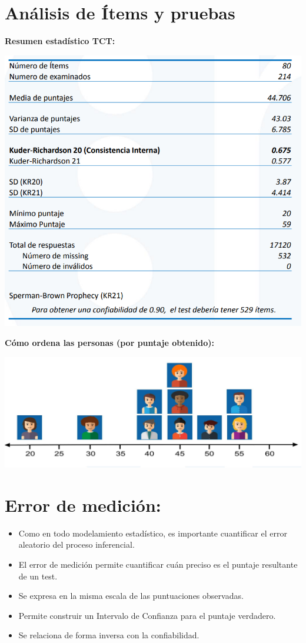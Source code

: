 \documentclass[
  letterpaper,
  DIV=11,
  numbers=noendperiod]{scrreprt}
\providecommand{\tightlist}{%
  \setlength{\itemsep}{0pt}\setlength{\parskip}{0pt}}
\begin{document}
\section{\texorpdfstring{\textbf{Análisis de Ítems y
pruebas}}{Análisis de Ítems y pruebas}}\label{anuxe1lisis-de-uxedtems-y-pruebas}

\textbf{Resumen estadístico TCT:}

\begin{center}
\includegraphics[width=0.6\linewidth,height=\textheight,keepaspectratio]{images/teoria_clasica_V-1.png}
\end{center}

\textbf{Cómo ordena las personas (por puntaje obtenido):}

\begin{center}
\includegraphics[width=0.6\linewidth,height=\textheight,keepaspectratio]{images/teoria_clasica_V-2.png}
\end{center}

\section{\texorpdfstring{\textbf{Error de
medición:}}{Error de medición:}}\label{error-de-mediciuxf3n}

\begin{itemize}
\tightlist
\item
  Como en todo modelamiento estadístico, es importante cuantificar el
  error aleatorio del proceso inferencial.
\item
  El error de medición permite cuantificar cuán preciso es el puntaje
  resultante de un test.
\item
  Se expresa en la misma escala de las puntuaciones observadas.
\item
  Permite construir un Intervalo de Confianza para el puntaje verdadero.
\item
  Se relaciona de forma inversa con la confiabilidad.
\end{itemize}
\end{document}
